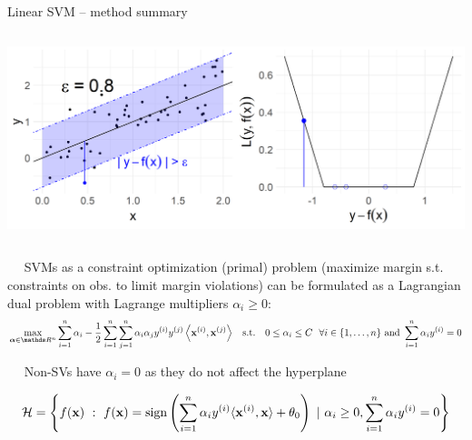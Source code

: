\begin{vbframe}{Linear SVM -- method summary}
\begin{columns}[T, totalwidth = \textwidth]
\begin{column}{0.38\textwidth}
  \includegraphics[height=\textwidth, keepaspectratio=true]{
  figure/loss_eps_insensitive.png}

\end{column}
\end{columns}

\medskip

 ~~ %
SVMs as a constraint optimization (primal) problem (maximize margin s.t. constraints on obs. to limit margin violations) can be formulated as a Lagrangian dual problem with Lagrange multipliers $\alpha_i \geq 0$: %
$$\max\limits_{\alphav \in \R^n} \dualobj \;\; \text{ s.t. } \;\; 0 \le \alpha_i \le C ~~ \forall i \in \nset \text{ and } \sum_{i=1}^n \alpha_i \yi = 0$$


 ~~ 
Non-SVs have $\alpha_i = 0$ as they do not affect the hyperplane

$$\mathcal{H}  = \left \{f(\mathbf{x}) ~:~ f(\mathbf{x}) = \operatorname{sign} \left( \sum\limits_{i=1}^n \alpha_i y^{(i)} \langle \mathbf{x}^{(i)}, \mathbf{x} \rangle  + \theta_0 \right) ~|~ \alpha_i \geq 0,  \sum\limits_{i=1}^n \alpha_i y^{(i)} = 0 \right \}$$

\framebreak



\end{vbframe}
